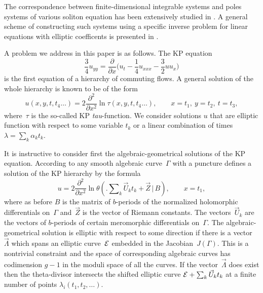 \documentclass[a4paper,11pt]{article}
\newcommand{\p}{\partial}
\newcommand{\cE}{{\cal E}}
\newcommand{\vL}{\Vec{\Lambda}}
\newcommand{\vU}{\Vec{U}}
\newcommand{\vZ}{\Vec{Z}}
\theoremstyle{plain}
\theoremstyle{remark}
\begin{document}
The correspondence between finite-dimensional integrable systems and
poles systems of various soliton equation has been extensively studied
in \cite{krbab,krnest,kreltoda,krwz,krzab}. A general scheme of
constructing such systems using a specific inverse problem for
linear equations with elliptic coefficents is presented in \cite{krnest}.

A problem we address in this paper is as follows. The KP equation
\begin{equation}\label{kp}
\frac{3}{4} u_{yy}=\frac{\p}{\p x} \biggl( u_t-\frac{1}{4}u_{xxx}-
\frac{3}{2} u u_x \biggr)
\end{equation}
is the first equation of a hierarchy of commuting flows.
A general solution of the whole hierarchy is known to be of
the form
$$
u(x,y,t,t_4\ldots)=2 \frac{\p^2}{\p x^2}\ln\tau(x,y,t,t_4\ldots),
\qquad x=t_1,\ y=t_2,\ t=t_3,
$$
where~$\tau$ is the so-called KP \emph{tau}-function.
We consider solutions $u$ that are elliptic function with
respect to some variable $t_k$ or a linear combination of times
$\lambda=\sum_k\alpha_kt_k$.

It is instructive to consider first the algebraic-geometrical solutions of
the KP equation. According to \cite{kr} any smooth algebraic curve~$\Gamma$
with a puncture defines a solution of the KP hierarchy by the formula
\begin{equation}
u=2 \frac{\p^2}{\p x^2}\ln \theta \left(\bigl.
\sum\nolimits_{k} \vU_k t_k+\vZ\, \bigr|\,B \right),\qquad x=t_1,
\end{equation}
where as before $B$ is the matrix of $b$-periods of the normalized holomorphic
differentials on~$\Gamma$ and~$\vZ$ is the vector of Riemann constants.
The vectors~$\vU_k$ are the vectors of $b$-periods of
certain meromorphic differentials on~$\Gamma$. The algebraic-geometrical
solution is elliptic with respect to some direction if there is a
vector~$\vL$ which spans an elliptic curve~$\cE$ embedded in the
Jacobian~$J(\Gamma)$. This is a nontrivial constraint and the space of
corresponding algebraic curves has codimension $g-1$ in the moduli space
of all the curves. If the vector~$\vL$ does exist then the theta-divisor
intersects the shifted elliptic curve $\cE+\sum_{k}\vU_kt_k$ at
a finite number of points $\lambda_i(t_1,t_2, \ldots)$.
\end{document}
